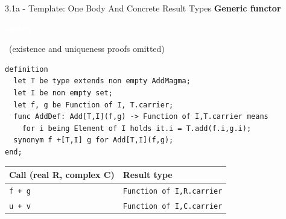 \documentclass[aspectratio=169,11pt]{beamer}
\newcommand{\statusbadge}[2]{\colorbox{#1}{\textcolor{white}{\strut\scriptsize\sffamily\bfseries #2}}}
\newcommand{\badgeSketch}{\statusbadge{orange!75!black}{sketch}}
\begin{document}
\begin{frame}[fragile,t]{3.1a - Template: One Body And Concrete Result Types}
\smallskip
\textbf{Generic functor}~\badgeSketch~{\footnotesize(existence and uniqueness proofs omitted)}
\begin{lstlisting}[language={mizar},basicstyle=\ttfamily\footnotesize]
definition
  let T be type extends non empty AddMagma;
  let I be non empty set;
  let f, g be Function of I, T.carrier;
  func AddDef: Add[T,I](f,g) -> Function of I,T.carrier means
    for i being Element of I holds it.i = T.add(f.i,g.i);
  synonym f +[T,I] g for Add[T,I](f,g);
end;
\end{lstlisting}
\begin{footnotesize}
\setlength{\tabcolsep}{3pt}
\renewcommand{\arraystretch}{1.15}
\begin{tabularx}{\textwidth}{>{\raggedright\arraybackslash}X>{\raggedright\arraybackslash}X}
\toprule
\textbf{Call (real R, complex C)\footnotemark[1]} & \textbf{Result type} \\
\midrule
\texttt{f + g} & \texttt{Function of I,R.carrier} \\
\texttt{u + v} & \texttt{Function of I,C.carrier} \\
\bottomrule
\end{tabularx}
\end{footnotesize}


\end{frame}
\end{document}
